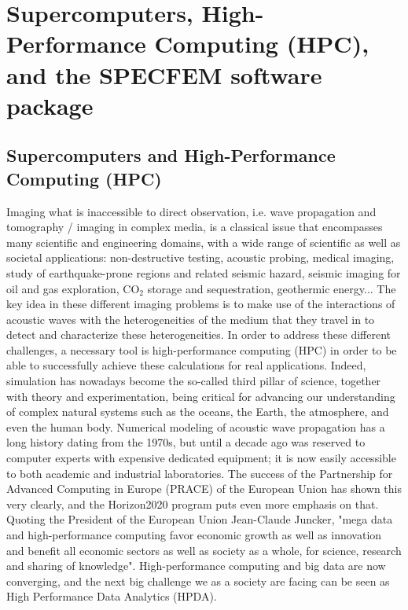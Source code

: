 \section{Supercomputers, High-Performance Computing (HPC), and the SPECFEM software package}

\subsection{Supercomputers and High-Performance Computing (HPC)}

Imaging what is inaccessible to direct observation, i.e. wave propagation and tomography / imaging in complex media, is a classical issue that encompasses many scientific and engineering domains, with a wide range of scientific as well as societal applications: non-destructive testing, acoustic probing, medical imaging, study of earthquake-prone regions and related seismic hazard, seismic imaging for oil and gas exploration, CO$_2$ storage and sequestration, geothermic energy... The key idea in these different imaging problems is to make use of the interactions of acoustic waves with the heterogeneities of the medium that they travel in to detect and characterize these heterogeneities. In order to address these different challenges, a necessary tool is high-performance computing (HPC) in order to be able to successfully achieve these calculations for real applications. Indeed, simulation has nowadays become the so-called third pillar of science, together with theory and experimentation, being critical for advancing our understanding of complex natural systems such as the oceans, the Earth, the atmosphere, and even the human body. Numerical modeling of acoustic wave propagation has a long history dating from the 1970s, but until a decade ago was reserved to computer experts with expensive dedicated equipment; it is now easily accessible to both academic and industrial laboratories. The success of the Partnership for Advanced Computing in Europe (PRACE) of the European Union has shown this very clearly, and the Horizon2020 program puts even more emphasis on that. Quoting the President of the European Union Jean-Claude Juncker, "mega data and high-performance computing favor economic growth as well as innovation and benefit all economic sectors as well as society as a whole, for science, research and sharing of knowledge". High-performance computing and big data are now converging, and the next big challenge we as a society are facing can be seen as High Performance Data Analytics (HPDA).

